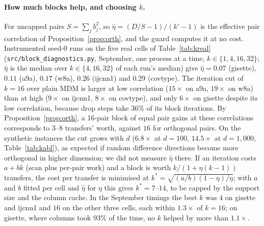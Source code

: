 \documentclass{opt2026}   %
\begin{document}
\paragraph{How much blocks help, and choosing $k$.} For uncapped pairs
$S=\sum_jb_j^2$, so $\hat\eta=(D/S-1)/(k'-1)$ is the effective pair
correlation of Proposition~\ref{prop:orth}, and the guard computes it at
no cost. Instrumented seed-0 runs on the five real cells of
Table~\ref{tab:kreal} (\texttt{src/block\_diagnostics.py}, September,
one process at a time, $k\in\{1,4,16,32\}$; $\hat\eta$ is the median over
$k\in\{4,16,32\}$ of each run's median) give $\hat\eta=0.07$
(gisette), $0.11$ (a9a), $0.17$ (w8a), $0.26$ (ijcnn1) and $0.29$
(covtype). The iteration cut of $k{=}16$ over plain MDM is larger at
low correlation ($15\times$ on a9a, $19\times$ on w8a) than at high
($9\times$ on ijcnn1, $8\times$ on covtype), and only $6\times$ on
gisette despite its low correlation, because drop steps take $36\%$ of
its block iterations. By Proposition~\ref{prop:orth}, a 16-pair block of equal pair gains at
these correlations corresponds to $3$--$8$ transfers' worth, against $16$ for orthogonal pairs. On the
synthetic instances the cut grows with $d$ ($6.8\times$ at $d{=}100$,
$14.5\times$ at $d{=}1{,}000$, Table~\ref{tab:kabl}), as expected if
random difference directions become more orthogonal in higher
dimension; we did not measure $\hat\eta$ there. If an iteration costs $a+bk$ (scan plus per-pair
work) and a block is worth $k/(1+\eta(k-1))$ transfers, the cost per
transfer is minimised at $k^*=\sqrt{(a/b)(1-\eta)/\eta}$; with $a$ and
$b$ fitted per cell and $\hat\eta$ for $\eta$ this gives $k^*=7$--$14$,
to be capped by the support size and the column cache. In the September timings the best $k$ was $4$ on gisette and ijcnn1 and
$16$ on the other three cells, each within $1.3\times$ of $k{=}16$; on
gisette, where columns took $93\%$ of the time, no $k$ helped by more
than $1.1\times$.
\end{document}
